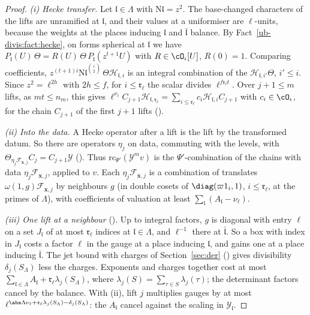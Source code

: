 \begin{proof}
\emph{(i) Hecke transfer.} Let $\mathfrak l\in\Lambda$ with $\mathrm N\mathfrak l=z^2$. The
base-changed characters of the lifts are unramified at $\mathfrak l$, and their values at a
uniformiser are $\ell$-units, because the weights at the places inducing $\mathfrak l$ and
$\bar{\mathfrak l}$ balance. By Fact~\ref{ub-divis:fact:hecke}, on forms spherical at $\mathfrak l$
we have $P_{\mathfrak l}(U)\,\Theta=R(U)\,\Theta\,P_{\mathfrak l}(z^{t+1}U)$ with $R\in\cO_\iota[U]$,
$R(0)=1$. Comparing coefficients, $z^{(t+1)i}\mathrm N\mathfrak l^{\binom i2}\,\Theta
\mathcal H_{\mathfrak l,i}$ is an integral combination of the $\mathcal H_{\mathfrak l,i'}\Theta$, $i'\le i$. Since
$z^2=\ell^{2h}$ with $2h\le f$, for $i\le\mathfrak r_\ell$ the scalar divides $\ell^{f\mathfrak r_\ell t}$. Over
$j+1\le m$ lifts, as $mt\le n_m$, this gives
$\ell^{\nu_\ell}C_{j+1}\mathcal H_{\mathfrak l,\mathfrak r_\ell}=\sum_{i\le\mathfrak r_\ell}c_i\mathcal H_{\mathfrak
l,i}C_{j+1}$ with $c_i\in\cO_\iota$, for the chain $C_{j+1}$ of the first $j+1$ lifts
().

\emph{(ii) Into the data.} A Hecke operator after a lift is the lift by the transformed datum. So
there are operators $\eta_j$ on data, commuting with the levels, with $\Theta_{\eta_j\mathcal F_{\mathbf x,j}}C_j=
C_{j+1}\mathcal Y$ (). Thus
$\mathrm{rc}_{\Psi'}(\mathcal Y^mv)$ is the $\Psi'$-combination of the chains with data $\eta_j\mathcal F_{\mathbf x,j}$,
applied to $v$. Each $\eta_j\mathcal F_{\mathbf x,j}$ is a combination of translates $\omega(1,g)\mathcal F_{\mathbf x,j}$ by
neighbours $g$ (in double cosets of $\diag(\varpi1_i,1)$, $i\le\mathfrak r_\ell$, at the primes of
$\Lambda$), with coefficients of valuation at least $\sum_{\mathfrak l}(A_{\mathfrak l}-\nu_\ell)$.

\emph{(iii) One lift at a neighbour} (). Up to
integral factors, $g$ is diagonal with entry $\ell$ on a set $J_{\mathfrak l}$ of at most $\mathfrak
r_\ell$ indices at $\mathfrak l\in\Lambda$, and $\ell^{-1}$ there at $\bar{\mathfrak l}$. So a box with
index in $J_{\mathfrak l}$ costs a factor $\ell$ in the gauge at a place inducing $\mathfrak l$, and
gains one at a place inducing $\bar{\mathfrak l}$. The jet bound with charges of Section~\ref{sec:der}
() gives divisibility $\delta_j(S_\Lambda)$ less the
charges. Exponents and charges together cost at most $\sum_{\mathfrak l\in\Lambda}A_{\mathfrak
l}+\mathfrak r_\ell\lambda_j(S_\Lambda)$, where $\lambda_j(S)=\sum_{\tau\in S}\lambda_j(\tau)$; the
determinant factors cancel by the balance. With (ii), lift $j$ multiplies gauges by at most
$\ell^{\abs\Lambda\nu_\ell+\mathfrak r_\ell\lambda_j(S_\Lambda)-\delta_j(S_\Lambda)}$: the $A_{\mathfrak l}$
cancel against the scaling in $\mathcal Y_{\mathfrak l}$.


\end{proof}
